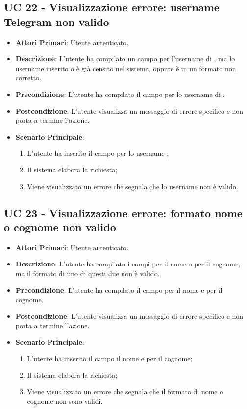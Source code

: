 
		\subsection{UC 22 - Visualizzazione errore: username Telegram non valido}
		\begin{itemize}
			\item \textbf{Attori Primari}: Utente autenticato.
			\item \textbf{Descrizione}: L'utente ha compilato un campo per l'username di , ma lo username inserito o è già censito nel sistema, oppure è in un formato non corretto.
			\item \textbf{Precondizione}: L'utente ha compilato il campo per lo username di .
			\item \textbf{Postcondizione}: L'utente visualizza un messaggio di errore specifico e non porta a termine l'azione.
			\item \textbf{Scenario Principale}:
			\begin{enumerate}
				\item L'utente ha inserito il campo per lo username ;
				\item Il sistema elabora la richiesta;
				\item Viene visualizzato un errore che segnala che lo username  non è valido.
			\end{enumerate}
		\end{itemize}



		\subsection{UC 23 - Visualizzazione errore: formato nome o cognome non valido}
		\begin{itemize}
			\item \textbf{Attori Primari}: Utente autenticato.
			\item \textbf{Descrizione}: L'utente ha compilato i campi per il nome o per il cognome, ma il formato di uno di questi due non è valido.
			\item \textbf{Precondizione}: L'utente ha compilato il campo per il nome e per il cognome.
			\item \textbf{Postcondizione}: L'utente visualizza un messaggio di errore specifico e non porta a termine l'azione.
			\item \textbf{Scenario Principale}:
			\begin{enumerate}
				\item L'utente ha inserito il campo il nome e per il cognome;
				\item Il sistema elabora la richiesta;
				\item Viene visualizzato un errore che segnala che il formato di nome o cognome non sono validi.
			\end{enumerate}
		\end{itemize}